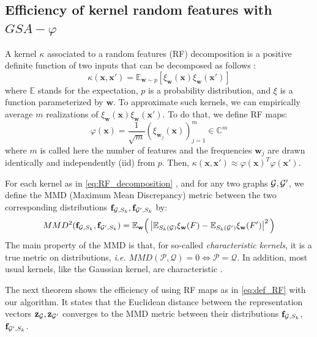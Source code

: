 \documentclass{article}
\begin{document}
\subsection{Efficiency of kernel random features with $GSA-\varphi$} 
\label{sec:MMD}
A kernel $\kappa$ associated to a random features (RF) decomposition is a positive definite function of two inputs that can be decomposed  as follows   \cite{rahimi2008random}:
\begin{equation}
\label{eq:RF_decomposition}
\kappa(\mathbf{x},\mathbf{x}')=\mathbb{E}_{\mathbf{w}\sim p}[ \xi_\mathbf{w}(\mathbf{x}) \xi_\mathbf{w}(\mathbf{x}')]
\end{equation}
where $\mathbb{E}$ stands for the expectation, $p$ is a probability distribution, and $\xi$ is a function parameterized by $\mathbf{w}$. 
To approximate such kernels, we can empirically average $m$ realizations of $\xi_\mathbf{w}(\mathbf{x}) \xi_\mathbf{w}(\mathbf{x}')$. To do that, we define RF maps:
\begin{equation}
	\label{eq:def_RF}
	\varphi(\mathbf{x}) = \frac{1}{\sqrt{m}} ( \xi_{\mathbf{w}_j}(\mathbf{x}) )_{j=1}^m \in \mathbb{C}^m
\end{equation}
where  $m$ is called here the number of features and the frequencies $\mathbf{w}_j$ are drawn identically and independently (iid) from $p$. Then, $\kappa(\mathbf{x},\mathbf{x}')\approx	\varphi(\mathbf{x})^T	\varphi(\mathbf{x}')$.

 For each kernel as in  \eqref{eq:RF_decomposition} , and for any two graphs $\mathcal{G},\mathcal{G}'$, we define the MMD (Maximum Mean Discrepancy) metric between the two corresponding distributions  $\mathbf{f}_{\mathcal{G},S_k}, \mathbf{f}_{\mathcal{G}',S_k}$ by:
 \[
 MMD^2(\mathbf{f}_{\mathcal{G},S_k}, \mathbf{f}_{\mathcal{G}',S_k}) = \mathbb{E}_{\mathbf{w}} \Big( \left| \mathbb{E}_{S_k(\mathcal{G})} \xi_\mathbf{w}(F) - \mathbb{E}_{S_k(\mathcal{G}')} \xi_\mathbf{w}(F') \right|^2 \Big)
 \]
 The main property of the MMD is that, for so-called \emph{characteristic kernels}, it is a true metric on distributions, \emph{i.e.} $MMD(\mathcal{P}, \mathcal{Q}) = 0 \Leftrightarrow \mathcal{P} = \mathcal{Q}$. In addition, most usual kernels, like the Gaussian kernel, are characteristic \cite{MMD}.
 
 The next theorem shows the efficiency of using RF maps as in \eqref{eq:def_RF} with our algorithm. It states  that the Euclidean distance between the representation vectors $\mathbf{z}_{\mathcal{G}}, \mathbf{z}_{\mathcal{G}'}$ converges to the MMD metric between their distributions $\mathbf{f}_{\mathcal{G},S_k}$, $\mathbf{f}_{\mathcal{G}',S_k}$. 
\end{document}
